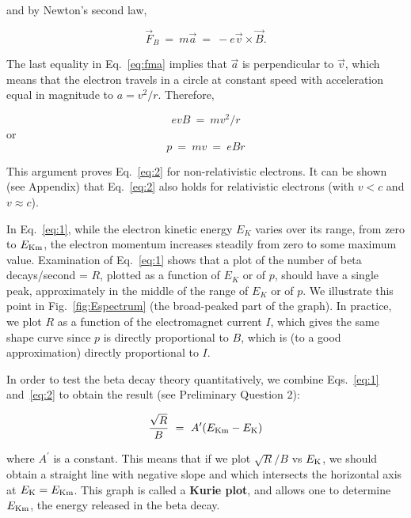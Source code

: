 \noindent and by Newton's second law,

\begin{equation}
\vec{F}_B~=~ m \vec{a} ~=~ - e \vec{v} \times \vec{B}.
\label{eq:fma}
\end{equation}

The last equality in Eq.~\ref{eq:fma} implies that $\vec{a}$ is
perpendicular to $\vec{v}$, which means
that the electron travels in a circle at constant speed with
acceleration equal in magnitude to $a = v^2/r$.
Therefore,

\begin{equation}
evB~=~mv^2/r
\end{equation}
or
\begin{equation}
p~=~mv~=~eBr
\end{equation}

\noindent This argument proves Eq.~\ref{eq:2} for non-relativistic electrons.
It can be shown (see Appendix) that Eq.~\ref{eq:2} also holds for relativistic
electrons (with $v < c$ and $v \approx c$).

In Eq.~\ref{eq:1}, while the electron kinetic energy $E_K$ varies over its
range, from zero to $E_{\rm Km}$, the electron momentum increases steadily from
zero to some maximum value.  Examination of Eq.~\ref{eq:1} shows that a plot of
the number of beta decays/second = $R$, plotted as a function of $E_K$ or of
$p$, should have a single peak, approximately in the middle of the range of
$E_K$ or of $p$.  We illustrate this point in Fig.~\ref{fig:Espectrum} (the
broad-peaked part of the graph).  In practice, we plot $R$ as a function of the
electromagnet current $I$, which gives the same shape curve since $p$ is
directly proportional to $B$, which is (to a good approximation) directly
proportional to $I$.

In order to test the beta decay theory quantitatively, we combine
Eqs.~\ref{eq:1} and~\ref{eq:2} to obtain the result (see Preliminary Question
2): 

\begin{equation}
{\sqrt{R} \over B}~=~A^\prime (E_{\rm Km} - E_{\rm K})
\label{eq:kurie}
\end{equation}

\noindent where $A^\prime$ is a constant.  This means that if we plot
$\sqrt{R}/B$ vs $E_{\rm K}$, we should obtain a straight line with negative
slope and which intersects the horizontal axis at $E_{\rm K} = E_{\rm Km}$.
This graph is called a \textbf{Kurie plot}, and allows one to determine $E_{\rm
  Km}$, the energy released in the beta decay.

